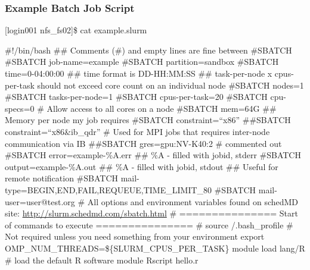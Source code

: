 \begin{frame}[fragile]
\frametitle{Example Batch Job Script}
\begin{semiverbatim}\tiny
[login001 nfs_fs02]\$ cat example.slurm

\#!/bin/bash
\#\# Comments (\#) and empty lines are fine between \#SBATCH
\#SBATCH \ddash{}job-name=example
\#SBATCH \ddash{}partition=sandbox
\#SBATCH \ddash{}time=0-04:00:00 ## time format is DD-HH:MM:SS
\#\# task-per-node x cpus-per-task should not exceed core count on an individual node 
\#SBATCH \ddash{}nodes=1
\#SBATCH \ddash{}tasks-per-node=1
\#SBATCH \ddash{}cpus-per-task=20
\#SBATCH \ddash{}cpu-specs=0 # Allow access to all cores on a node
\#SBATCH \ddash{}mem=64G \#\# Memory per node my job requires
\#SBATCH \ddash{}constraint=``x86''
\#\#SBATCH \ddash{}constraint=``x86\&ib_qdr'' \# Used for MPI jobs that requires inter-node communication via IB
\#\#SBATCH \ddash{}gres=gpu:NV-K40:2 \# commented out
\#SBATCH \ddash{}error=example-\%A.err \#\# \%A - filled with jobid, stderr
\#SBATCH \ddash{}output=example-\%A.out \#\# \%A - filled with jobid, stdout
\#\# Useful for remote notification
\#SBATCH \ddash{}mail-type=BEGIN,END,FAIL,REQUEUE,TIME\_LIMIT\_80
\#SBATCH \ddash{}mail-user=user@test.org
\# All options and environment variables found on schedMD site: \href{http://slurm.schedmd.com/sbatch.html}{http://slurm.schedmd.com/sbatch.html}
\# =============== Start of commands to execute ===============
\# source \ctilde/.bash_profile \# Not required unless you need something from your environment
export OMP\_NUM\_THREADS=\$\{SLURM\_CPUS\_PER\_TASK\}
module load lang/R  \# load the default R software module
Rscript hello.r
\end{semiverbatim}
\end{frame}





